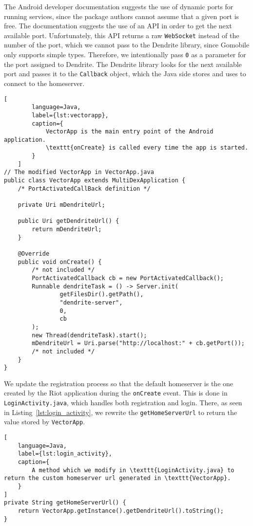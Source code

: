 The Android developer documentation suggests the use of dynamic ports for running services, since the package authors cannot assume that a given port is free.
The documentation suggests the use of an API in order to get the next available port.
Unfortunately, this API returns a raw \texttt{WebSocket} instead of the number of the port, which we cannot pass to the Dendrite library, since Gomobile only supports simple types.
Therefore, we intentionally pass \texttt{0} as a parameter for the port assigned to Dendrite.
The Dendrite library looks for the next available port and passes it to the \texttt{Callback} object, which the Java side stores and uses to connect to the homeserver.

\begin{lstfloat}
	\begin{lstlisting}[
        language=Java,
        label={lst:vectorapp},
        caption={
            VectorApp is the main entry point of the Android application.
            \texttt{onCreate} is called every time the app is started.
        }
    ]
// The modified VectorApp in VectorApp.java
public class VectorApp extends MultiDexApplication {
    /* PortActivatedCallBack definition */

    private Uri mDendriteUrl;

    public Uri getDendriteUrl() {
        return mDendriteUrl;
    }

    @Override
    public void onCreate() {
        /* not included */
        PortActivatedCallback cb = new PortActivatedCallback();
        Runnable dendriteTask = () -> Server.init(
                getFilesDir().getPath(),
                "dendrite-server",
                0,
                cb
        );
        new Thread(dendriteTask).start();
        mDendriteUrl = Uri.parse("http://localhost:" + cb.getPort());
        /* not included */
    }
}
\end{lstlisting}
\end{lstfloat}

We update the registration process so that the default homeserver is the one created by the Riot application during the \texttt{onCreate} event.
This is done in \texttt{LoginActivity.java}, which handles both registration and login.
There, as seen in Listing~\ref{lst:login_activity}, we rewrite the \texttt{getHomeServerUrl} to return the value stored by \texttt{VectorApp}.

\begin{lstfloat}
	\begin{lstlisting}[
    language=Java,
    label={lst:login_activity},
    caption={
        A method which we modify in \texttt{LoginActivity.java} to return the custom homeserver url generated in \texttt{VectorApp}.
    }
]
private String getHomeServerUrl() {
    return VectorApp.getInstance().getDendriteUrl().toString();
}
\end{lstlisting}
\end{lstfloat}

